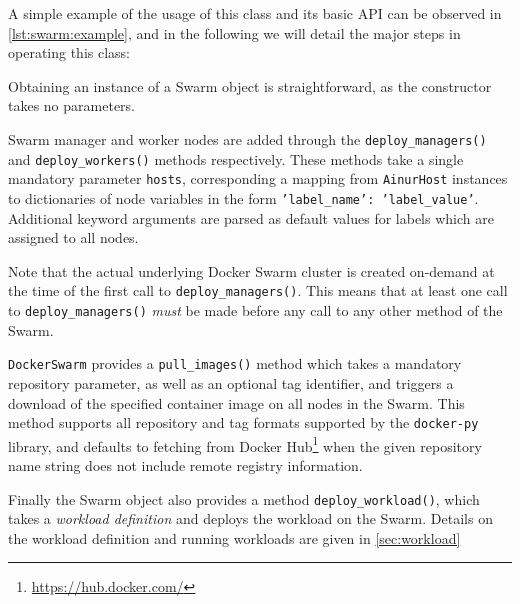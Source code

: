 A simple example of the usage of this class and its basic \ac{API} can be observed in \cref{lst:swarm:example}, and in the following we will detail the major steps in operating this class:
\begin{description}[]
    \item[Instantiating a \texttt{DockerSwarm} object.]
    Obtaining an instance of a Swarm object is straightforward, as the constructor takes no parameters.
    \item[Adding Swarm nodes.]
    Swarm manager and worker nodes are added through the \texttt{deploy_managers()} and \texttt{deploy_workers()} methods respectively.
    These methods take a single mandatory parameter \texttt{hosts}, corresponding a mapping from \texttt{AinurHost} instances to dictionaries of node variables in the form \texttt{{'label_name': 'label_value'}}.
    Additional keyword arguments are parsed as default values for labels which are assigned to all nodes.

    Note that the actual underlying Docker Swarm cluster is created on-demand at the time of the first call to \texttt{deploy_managers()}.
    This means that at least one call to \texttt{deploy_managers()} \emph{must} be made before any call to any other method of the Swarm.
    \item[Fetching required container images.]
    \texttt{DockerSwarm} provides a \texttt{pull_images()} method which takes a mandatory repository parameter, as well as an optional tag identifier, and triggers a download of the specified container image on all nodes in the Swarm.
    This method supports all repository and tag formats supported by the \verb|docker-py| library, and defaults to fetching from Docker Hub\footnote{\url{https://hub.docker.com/}} when the given repository name string does not include remote registry information.
    \item[Workload Deployment.]
    Finally the Swarm object also provides a method \texttt{deploy_workload()}, which takes a \emph{workload definition} and deploys the workload on the Swarm.
    Details on the workload definition and running workloads are given in \cref{sec:workload} 
\end{description}
